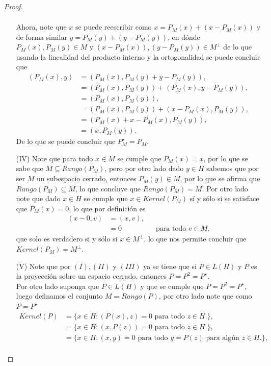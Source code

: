 \begin{proof}
\begin{enumerate}
\begin{align*}
      \end{align*}
      Ahora, note que $x$ se puede reescribir como $x=P_{M}(x)+\left( x-P_{M}(x) \right)$ y de forma similar $y=P_{M}(y)+\left( y-P_{M}(y) \right)$, en dónde $P_{M}(x),P_{M}(y)\in M$ y $\left( x-P_{M}(x) \right),\left( y-P_{M}(y) \right)\in M^{\perp}$ de lo que usando la linealidad del producto interno y la ortogonalidad se puede concluir que
      \begin{align*}
        \left( P_{M}(x),y \right)&=(P_{M}(x),P_{M}(y)+y-P_{M}(y)),\\
        &=(P_{M}(x),P_{M}(y))+(P_{M}(x),y-P_{M}(y)),\\
        &=(P_{M}(x),P_{M}(y)),\\
        &=(P_{M}(x),P_{M}(y))+(x-P_{M}(x),P_{M}(y)),\\
        &=(P_{M}(x)+x-P_{M}(x),P_{M}(y)),\\
        &=(x,P_{M}(y)).
      \end{align*}
      De lo que se puede concluir que $P_{M}^{\star}=P_{M}$.
    \item[(IV)] Note que para todo $x\in M$ se cumple que $P_{M}(x)=x$, por lo que se sabe que $M\subseteq Rango(P_M)$, pero por otro lado dado $y\in H$ sabemos que por ser $M$ un subespacio cerrado, entonces $P_{M}(y)\in M$, por lo que se afirma que $Rango(P_{M})\subseteq M$, lo que concluye que $Rango(P_{M})=M$. Por otro lado note que dado $x\in H$ se cumple que $x\in Kernel(P_{M})$ sí y sólo si se satisface que $P_{M}(x)=0$, lo que por definición es
      \begin{align*}
        (x-0,v)&=(x,v),\\
        &=0&&\text{para todo $v\in M$.}
      \end{align*}
      que solo es verdadero si y sólo si $x\in M^{\perp}$, lo que nos permite concluir que $Kernel(P_{M})=M^{\perp}$.
    \item[(V)] Note que por $(I), (II)$ y $(III)$ ya se tiene que si $P\in L(H)$ y $P$ es la proyección sobre un espacio cerrado, entonces $P=P^{2}=P^{\star}$.\\
      Por otro lado suponga que $P\in L(H)$ y que se cumple que $P=P^{2}=P^{\star}$, luego definamos el conjunto $M=Rango(P)$, por otro lado note que como $P=P^{\star}$
      \begin{align*}
        Kernel(P)&=\{x\in H:(P(x),z)=0\text{ para todo $z\in H$.}\},\\
        &=\{x\in H:(x,P(z))=0\text{ para todo $z\in H$.}\},\\
        &=\{x\in H:(x,y)=0\text{ para todo $y=P(z)$ para algún $z\in H$.}\},\\

\end{align*}
\end{enumerate}
\end{proof}
